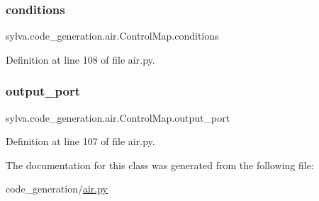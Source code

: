\subsubsection{\texorpdfstring{conditions}{conditions}}
{\footnotesize\ttfamily sylva.\+code\+\_\+generation.\+air.\+Control\+Map.\+conditions}



Definition at line 108 of file air.\+py.

\mbox{\label{classsylva_1_1code__generation_1_1air_1_1_control_map_ab1eb2dd172ed3e35b4d93645aca8b340}} 
\subsubsection{\texorpdfstring{output\+\_\+port}{output\_port}}
{\footnotesize\ttfamily sylva.\+code\+\_\+generation.\+air.\+Control\+Map.\+output\+\_\+port}



Definition at line 107 of file air.\+py.



The documentation for this class was generated from the following file\+:\begin{DoxyCompactItemize}
\item 
code\+\_\+generation/\hyperlink{air_8py}{air.\+py}\end{DoxyCompactItemize}
